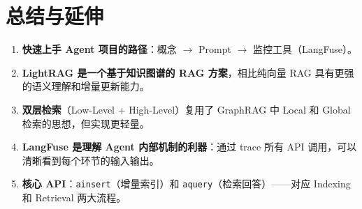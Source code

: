 \section{总结与延伸}

\begin{enumerate}
    \item \textbf{快速上手 Agent 项目的路径}：概念 $\rightarrow$ Prompt $\rightarrow$ 监控工具（LangFuse）。
    \item \textbf{LightRAG 是一个基于知识图谱的 RAG 方案}，相比纯向量 RAG 具有更强的语义理解和增量更新能力。
    \item \textbf{双层检索}（Low-Level + High-Level）复用了 GraphRAG 中 Local 和 Global 检索的思想，但实现更轻量。
    \item \textbf{LangFuse 是理解 Agent 内部机制的利器}：通过 trace 所有 API 调用，可以清晰看到每个环节的输入输出。
    \item \textbf{核心 API}：\texttt{ainsert}（增量索引）和 \texttt{aquery}（检索回答）——对应 Indexing 和 Retrieval 两大流程。
\end{enumerate}



